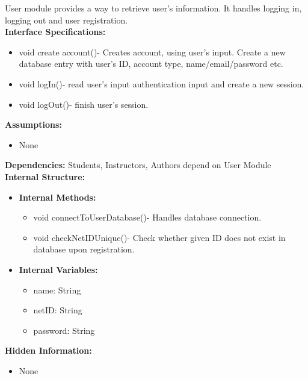 User module provides a way to retrieve user’s information. It handles logging in, logging out and user registration.\\
\textbf{Interface Specifications:}\\
\begin{itemize}
    \item void create account()- Creates account, using user's input. Create a new database entry with user's ID, account type, name/email/password etc.
   \item  void logIn()- read user's input authentication input and create a new session.  
\item  void logOut()- finish user's session.
\end{itemize}
\textbf{Assumptions:}
\begin{itemize}
\item None
\end{itemize}
\textbf{Dependencies:}
Students, Instructors, Authors depend on User Module\\
\textbf{Internal Structure:}
    \begin{itemize}
      \item \textbf{Internal Methods:}
            \begin{itemize}
                \item void connectToUserDatabase()- Handles database connection.
                \item void checkNetIDUnique()- Check whether given ID does not exist in database upon registration.
            \end{itemize}
       \item \textbf{Internal Variables:}
        \begin{itemize}
            \item  name: String
            \item  netID: String
            \item  password: String
        \end{itemize}
        \end{itemize}
         \textbf{Hidden Information:}
        \begin{itemize}
        \item None
        \end{itemize}
   







